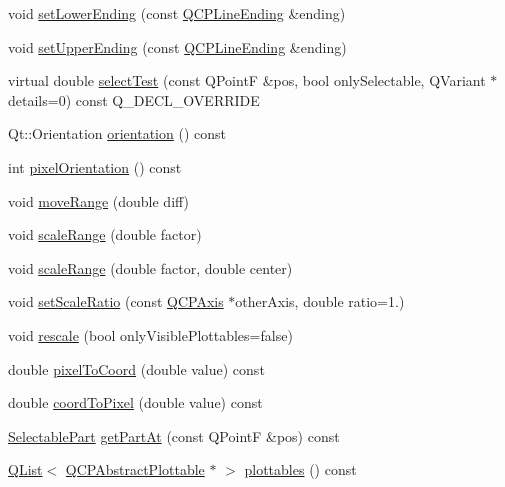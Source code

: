 \begin{DoxyCompactItemize}
\item 
void \hyperlink{class_q_c_p_axis_a08af1c72db9ae4dc8cb8a973d44405ab}{set\+Lower\+Ending} (const \hyperlink{class_q_c_p_line_ending}{Q\+C\+P\+Line\+Ending} \&ending)
\item 
void \hyperlink{class_q_c_p_axis_a69119b892fc306f651763596685aa377}{set\+Upper\+Ending} (const \hyperlink{class_q_c_p_line_ending}{Q\+C\+P\+Line\+Ending} \&ending)
\item 
virtual double \hyperlink{class_q_c_p_axis_a63b7103c57fe9acfbce164334ea837f8}{select\+Test} (const Q\+PointF \&pos, bool only\+Selectable, Q\+Variant $\ast$details=0) const Q\+\_\+\+D\+E\+C\+L\+\_\+\+O\+V\+E\+R\+R\+I\+DE
\item 
Qt\+::\+Orientation \hyperlink{class_q_c_p_axis_a57483f2f60145ddc9e63f3af53959265}{orientation} () const 
\item 
int \hyperlink{class_q_c_p_axis_ae3b000e10a6885b8ee05298ae7124ab6}{pixel\+Orientation} () const 
\item 
void \hyperlink{class_q_c_p_axis_a18f3a68f2b691af1fd34b6593c886630}{move\+Range} (double diff)
\item 
void \hyperlink{class_q_c_p_axis_a31d18ddf3a4f21ceb077db8ae5b69856}{scale\+Range} (double factor)
\item 
void \hyperlink{class_q_c_p_axis_a7072ff96fe690148f1bbcdb4f773ea1c}{scale\+Range} (double factor, double center)
\item 
void \hyperlink{class_q_c_p_axis_af4bbd446dcaee5a83ac30ce9bcd6e125}{set\+Scale\+Ratio} (const \hyperlink{class_q_c_p_axis}{Q\+C\+P\+Axis} $\ast$other\+Axis, double ratio=1.)
\item 
void \hyperlink{class_q_c_p_axis_a499345f02ebce4b23d8ccec96e58daa9}{rescale} (bool only\+Visible\+Plottables=false)
\item 
double \hyperlink{class_q_c_p_axis_ae9289ef7043b9d966af88eaa95b037d1}{pixel\+To\+Coord} (double value) const 
\item 
double \hyperlink{class_q_c_p_axis_a985ae693b842fb0422b4390fe36d299a}{coord\+To\+Pixel} (double value) const 
\item 
\hyperlink{class_q_c_p_axis_abee4c7a54c468b1385dfce2c898b115f}{Selectable\+Part} \hyperlink{class_q_c_p_axis_ab2965a8ab1da948b897f1c006080760b}{get\+Part\+At} (const Q\+PointF \&pos) const 
\item 
\hyperlink{class_q_list}{Q\+List}$<$ \hyperlink{class_q_c_p_abstract_plottable}{Q\+C\+P\+Abstract\+Plottable} $\ast$ $>$ \hyperlink{class_q_c_p_axis_a4f7404494cccdbfc00e1e865b7ed16a4}{plottables} () const 

\end{DoxyCompactItemize}
